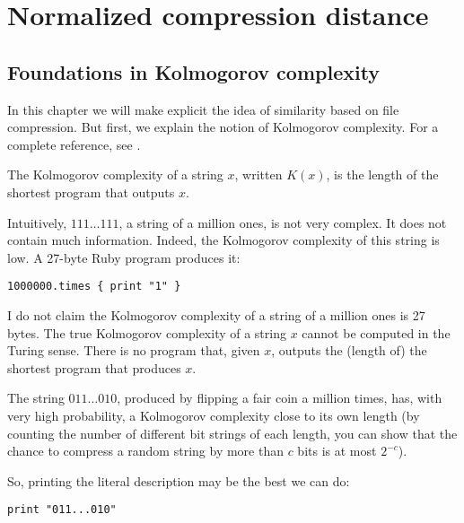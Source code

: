 
\chapter{Normalized compression distance} %

\label{Chapter2} %


\section{Foundations in Kolmogorov complexity}

In this chapter we will make explicit the idea of similarity based on file compression. But first, we explain the notion of Kolmogorov complexity. For a complete reference, see \cite{li2009introduction}.

The Kolmogorov complexity of a string $x$, written $K(x)$, is the length of the shortest program that outputs $x$. 

Intuitively, $111\dots111$, a string of a million ones, is not very complex. It does not contain much information. Indeed, the Kolmogorov complexity of this string is low. A 27-byte Ruby program produces it:

\begin{verbatim}
1000000.times { print "1" }
\end{verbatim}

I do not claim the Kolmogorov complexity of a string of a million ones is 27 bytes. The true Kolmogorov complexity of a string $x$ cannot be computed in the Turing sense. There is no program that, given $x$, outputs the (length of) the shortest program that produces $x$.

The string $011\dots010$, produced by flipping a fair coin a million times, has, with very high probability, a Kolmogorov complexity close to its own length (by counting the number of different bit strings of each length, you can show that the chance to compress a random string by more than $c$ bits is at most $2^{-c}$).

So, printing the literal description may be the best we can do:

\begin{verbatim}
print "011...010"
\end{verbatim}

